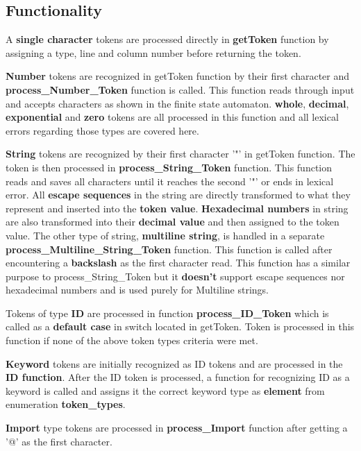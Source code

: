 \documentclass[a4paper, 11pt]{article}
\begin{document}
\subsection{Functionality}
A \textbf{single character} tokens are processed directly in \textbf{getToken} function by assigning a type, line and 
column number before returning the token.
\par
\textbf{Number} tokens are recognized in getToken function by their first character and \textbf{process\_Number\_Token} 
function is called. This function reads through input and accepts characters as shown in the finite state automaton. 
\textbf{whole}, \textbf{decimal}, \textbf{exponential} and \textbf{zero} tokens are all processed in this function 
and all lexical errors regarding those types are covered here. 
\par
\textbf{String} tokens are recognized by their first character '"' in getToken function. The token is then processed 
in \textbf{process\_String\_Token} function. This function reads and saves all characters until it reaches the second '"' 
or ends in lexical error. All \textbf{escape sequences} in the string are directly transformed to what they represent 
and inserted into the \textbf{token value}. \textbf{Hexadecimal numbers} in string are also transformed into their 
\textbf{decimal value} and then assigned to the token value. The other type of string, \textbf{multiline string}, 
is handled in a separate \textbf{process\_Multiline\_String\_Token} function. This function is called after encountering 
a \textbf{backslash} as the first character read. This function has a similar purpose to process\_String\_Token but it \textbf{doesn't} 
support escape sequences nor hexadecimal numbers and is used purely for Multiline strings.
\par
Tokens of type \textbf{ID} are processed in function \textbf{process\_ID\_Token} which is called as a \textbf{default case} 
in switch located in getToken. Token is processed in this function if none of the above token types criteria were met.
\par
\textbf{Keyword} tokens are initially recognized as ID tokens and are processed in the \textbf{ID function}. After the ID token 
is processed, a function for recognizing ID as a keyword is called and assigns it the correct keyword type as \textbf{element} from enumeration \textbf{token\_types}.
\par
\textbf{Import} type tokens are processed in \textbf{process\_Import} function after getting a '@' as the first character. 
\end{document}
